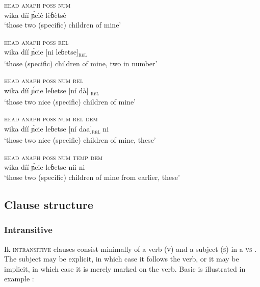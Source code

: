 \ea\label{ex:syn:6}
\gll \textsc{head} \textsc{anaph} \textsc{poss} \textsc{num} \\
wika díí \'{ɲ}cìè lèɓètsè    \\
\glt ‘those two (specific) children of mine’ 
\z





\ea\label{ex:syn:7}
\gll \textsc{head} \textsc{anaph} \textsc{poss} \textsc{rel}  \\
wika díí \'{ɲ}cie [ni leɓetse]\textsc{\textsubscript{rel}}    \\
\glt ‘those (specific) children of mine, two in number’ 
\z





\ea\label{ex:syn:8}
\gll \textsc{head} \textsc{anaph} \textsc{poss} \textsc{num} \textsc{rel} \\
wika díí \'{ɲ}cie leɓetse [ní dà]\textsc{\textsubscript{ rel}}    \\
\glt ‘those two nice (specific) children of mine’ 
\z





\ea\label{ex:syn:9}
\gll \textsc{head} \textsc{anaph} \textsc{poss} \textsc{num} \textsc{rel} \textsc{dem} \\
wika díí \'{ɲ}cie leɓetse [{ní daa}]\textsc{\textsubscript{rel}} ni    \\
\glt ‘those two nice (specific) children of mine, these’ 
\z





\ea\label{ex:syn:10}
\gll \textsc{head} \textsc{anaph} \textsc{poss} \textsc{num} \textsc{temp} \textsc{dem} \\
wika díí \'{ɲ}cie leɓetse níi ni    \\
\glt ‘those two (specific) children of mine from earlier, these’ 
\z






\subsection{Clause structure}\label{sec:10.2}
\subsubsection{Intransitive}\label{sec:10.2.1}

Ik \textsc{intransitive} clauses consist minimally of a verb (\textsc{v}) and a subject (\textsc{s}) in a \textsc{vs} . The subject may be explicit, in which case it follows the verb, or it may be implicit, in which case it is merely marked on the verb. Basic   is illustrated in example :





